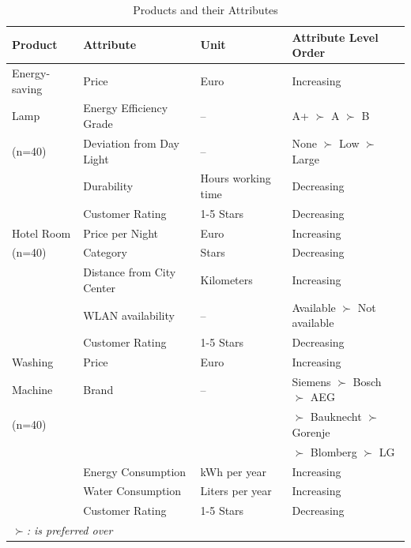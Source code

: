  \begin{table}[!h]
	\caption{Products and their Attributes}\label{tab:productsExp1}
	\begin{center}\small
		\begin{tabularx}{15cm}{llll}
			\hline
			Product & Attribute & Unit & Attribute Level Order\\
			\hline
			Energy-saving & Price & Euro & Increasing \\
      Lamp& Energy Efficiency Grade & -- & A+ $\succ$ A $\succ$ B  \\
      (n=40)& Deviation from Day Light & -- & None $\succ$ Low $\succ$ Large \\
      & Durability & Hours working time & Decreasing \\
      & Customer Rating & 1-5 Stars & Decreasing \\
			\hline
			Hotel Room & Price per Night & Euro & Increasing \\
      (n=40)& Category & Stars & Decreasing \\
      & Distance from City Center & Kilometers & Increasing \\
      & WLAN availability & -- & Available $ \succ$ Not available \\
      & Customer Rating & 1-5 Stars & Decreasing \\
			\hline
			Washing & Price & Euro & Increasing \\
      Machine& Brand & -- & Siemens $\succ$ Bosch $\succ$ AEG \\
      (n=40)& & & $\succ$ Bauknecht $\succ$ Gorenje \\
      & & & $\succ$ Blomberg $\succ$ LG \\
      & Energy Consumption & kWh per year & Increasing \\
      & Water Consumption & Liters per year & Increasing \\
      & Customer Rating & 1-5 Stars & Decreasing \\
			\hline			
      \multicolumn{3}{l}{$\succ$\emph{: is preferred over}}
		\end{tabularx}
	\end{center}
\end{table}

